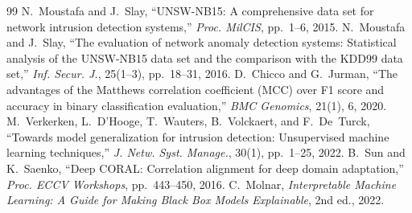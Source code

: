 \documentclass[11pt,a4paper]{article}
\begin{document}
\begin{thebibliography}{99}
 N.~Moustafa and J.~Slay, ``UNSW-NB15: A comprehensive data set for network intrusion detection systems,'' \emph{Proc. MilCIS}, pp.~1--6, 2015.
 N.~Moustafa and J.~Slay, ``The evaluation of network anomaly detection systems: Statistical analysis of the UNSW-NB15 data set and the comparison with the KDD99 data set,'' \emph{Inf. Secur. J.}, 25(1--3), pp.~18--31, 2016.
 D.~Chicco and G.~Jurman, ``The advantages of the Matthews correlation coefficient (MCC) over F1 score and accuracy in binary classification evaluation,'' \emph{BMC Genomics}, 21(1), 6, 2020.
 M.~Verkerken, L.~D'Hooge, T.~Wauters, B.~Volckaert, and F.~De~Turck, ``Towards model generalization for intrusion detection: Unsupervised machine learning techniques,'' \emph{J. Netw. Syst. Manage.}, 30(1), pp.~1--25, 2022.
 B.~Sun and K.~Saenko, ``Deep CORAL: Correlation alignment for deep domain adaptation,'' \emph{Proc. ECCV Workshops}, pp.~443--450, 2016.
 C.~Molnar, \emph{Interpretable Machine Learning: A Guide for Making Black Box Models Explainable}, 2nd ed., 2022.
\end{thebibliography}
\end{document}
